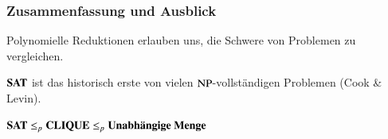 \documentclass[aspectratio=1610,onlymath]{beamer}
\begin{document}
\begin{frame}\frametitle{Zusammenfassung und Ausblick}



Polynomielle Reduktionen erlauben uns, die Schwere von Problemen zu vergleichen.
\bigskip

$\textbf{\textcolor{black}{SAT}}$ ist das historisch erste von vielen ${\textsc{NP}}$-vollständigen Problemen (Cook \& Levin).\bigskip

$\textbf{\textcolor{black}{SAT}}\leq_p\textbf{\textcolor{black}{CLIQUE}}\leq_p \textbf{\textcolor{black}{Unabhängige Menge}}$
\bigskip



\end{frame}

% 
% 
% 
% 
% 
% 
\end{document}
